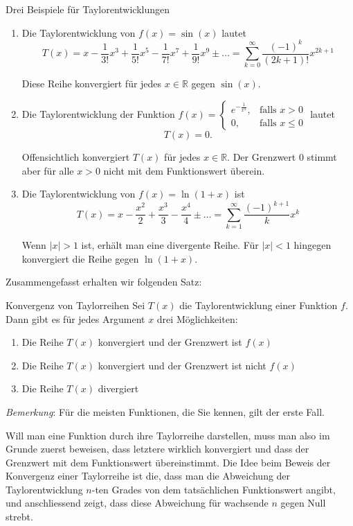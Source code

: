 \begin{bsp}
	{Drei Beispiele für Taylorentwicklungen}{}
	\begin{enumerate}
		\item Die Taylorentwicklung von \(f(x) = \sin(x)\) lautet
		      \[T(x) = x - \frac{1}{3!}x^3 + \frac{1}{5!}x^5 - \frac{1}{7!}x^7 + \frac{1}{9!}x^9 \pm \ldots = \sum_{k=0}^{\infty} \frac{(-1)^k}{(2k+1)!} x^{2k+1}\]

		      Diese Reihe konvergiert für jedes \(x \in \mathbb{R}\) gegen \(\sin(x)\).
		\item Die Taylorentwicklung der Funktion \( f(x) = \begin{cases} e^{-\frac{1}{x^2}}, & \text{falls } x > 0 \\ 0, & \text{falls } x \leq 0 \end{cases} \) lautet
		      \[ T(x) = 0. \]

		      Offensichtlich konvergiert \( T(x) \) für jedes \( x \in \mathbb{R} \). Der Grenzwert 0 stimmt aber für alle \( x > 0 \) nicht mit dem Funktionswert überein.
		\item Die Taylorentwicklung von \( f(x) = \ln(1+x) \) ist
		      \[ T(x) = x - \frac{x^2}{2} + \frac{x^3}{3} - \frac{x^4}{4} \pm \ldots = \sum_{k=1}^{\infty} \frac{(-1)^{k+1}}{k} x^k \]

		      Wenn \( |x| > 1 \) ist, erhält man eine divergente Reihe. Für \( |x| < 1 \) hingegen konvergiert die Reihe gegen \( \ln(1+x) \).

	\end{enumerate}
\end{bsp}
Zusammengefasst erhalten wir folgenden Satz:
\begin{satz}
	{Konvergenz von Taylorreihen}{}
	Sei $T(x)$ die Taylorentwicklung einer Funktion $f$. Dann gibt es für jedes Argument $x$ drei Möglichkeiten:
	\begin{enumerate}
		\item Die Reihe $T(x)$ konvergiert und der Grenzwert ist $f(x)$
		\item         Die Reihe $T(x)$ konvergiert und der Grenzwert ist nicht $f(x)$
		\item
		      Die Reihe $T(x)$ divergiert
	\end{enumerate}

\end{satz}
\emph{Bemerkung}: Für die meisten Funktionen, die Sie kennen, gilt der erste Fall.

Will man eine Funktion durch ihre Taylorreihe darstellen, muss man also im Grunde zuerst beweisen, dass letztere wirklich konvergiert und dass der Grenzwert mit dem Funktionswert übereinstimmt.
Die Idee beim Beweis der Konvergenz einer Taylorreihe ist die, dass man die Abweichung der Taylorentwicklung $n$-ten Grades von dem tatsächlichen Funktionswert angibt, und anschliessend zeigt, dass diese Abweichung für wachsende $n$ gegen Null strebt.

